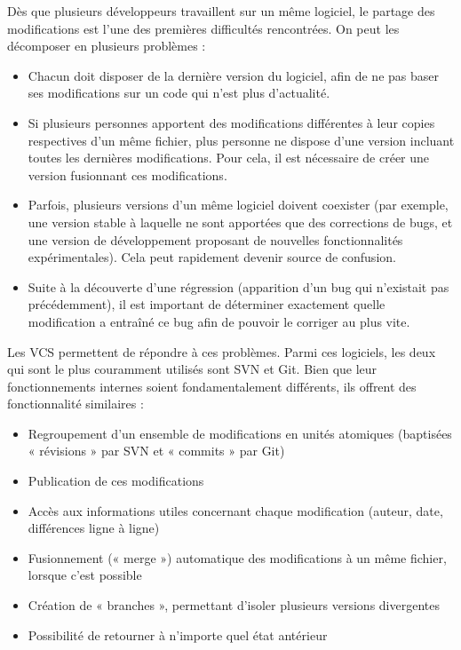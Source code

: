 Dès que plusieurs développeurs travaillent sur un même logiciel, le partage des modifications est l'une des premières difficultés rencontrées. On peut les décomposer en plusieurs problèmes :

\begin{itemize}
\item Chacun doit disposer de la dernière version du logiciel, afin de ne pas baser ses modifications sur un code qui n’est plus d’actualité.
\item Si plusieurs personnes apportent des modifications différentes à leur copies respectives d’un même fichier, plus personne ne dispose d’une version incluant toutes les dernières modifications. Pour cela, il est nécessaire de créer une version fusionnant ces modifications.
\item Parfois, plusieurs versions d’un même logiciel doivent coexister (par exemple, une version stable à laquelle ne sont apportées que des corrections de bugs, et une version de développement proposant de nouvelles fonctionnalités expérimentales). Cela peut rapidement devenir source de confusion.
\item Suite à la découverte d’une régression (apparition d’un bug qui n’existait pas précédemment), il est important de déterminer exactement quelle modification a entraîné ce bug afin de pouvoir le corriger au plus vite.
\end{itemize}


Les \gls{VCS} permettent de répondre à ces problèmes. Parmi ces logiciels, les deux qui sont le plus couramment utilisés sont SVN et Git. Bien que leur fonctionnements internes soient fondamentalement différents, ils offrent des fonctionnalité similaires :

\begin{itemize}
\item Regroupement d’un ensemble de modifications en unités atomiques (baptisées « révisions » par SVN et « commits » par Git)
\item Publication de ces modifications
\item Accès aux informations utiles concernant chaque modification (auteur, date, différences ligne à ligne)
\item Fusionnement (« merge ») automatique des modifications à un même fichier, lorsque c’est possible
\item Création de « branches », permettant d’isoler plusieurs versions divergentes
\item Possibilité de retourner à n’importe quel état antérieur
\end{itemize}

